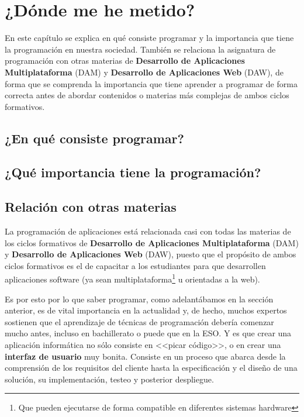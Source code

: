 
\chapter{¿Dónde me he metido?}

En este capítulo se explica en qué consiste programar y la importancia que tiene la programación en nuestra sociedad. 
También se relaciona la asignatura de programación con otras materias de \textbf{Desarrollo de Aplicaciones Multiplataforma} (DAM)
y \textbf{Desarrollo de Aplicaciones Web} (DAW), de forma que se comprenda la importancia que tiene aprender a programar de forma correcta
antes de abordar contenidos o materias más complejas de ambos ciclos formativos.

\section{¿En qué consiste programar?}



\section{¿Qué importancia tiene la programación?}



\section{Relación con otras materias}

La programación de aplicaciones está relacionada casi con todas las materias de los ciclos formativos de 
\textbf{Desarrollo de Aplicaciones Multiplataforma} (DAM) y \textbf{Desarrollo de Aplicaciones Web} (DAW), puesto que el 
propósito de ambos ciclos formativos es el de capacitar a los estudiantes para que desarrollen aplicaciones software
(ya sean multiplataforma\footnote{Que pueden ejecutarse de forma compatible en diferentes sistemas hardware} u orientadas a la web).

Es por esto por lo que saber programar, como adelantábamos en la sección anterior, es de vital importancia en la actualidad y,
de hecho, muchos expertos sostienen que el aprendizaje de técnicas de programación debería comenzar mucho antes, incluso en
bachillerato o puede que en la ESO. Y es que crear una aplicación informática no sólo consiste en <<picar código>>, o en crear una \textbf{interfaz de usuario} muy bonita.
Consiste en un proceso que abarca desde la comprensión de los requisitos del cliente hasta la especificación y el diseño de una 
solución, su implementación, testeo y posterior despliegue. 

